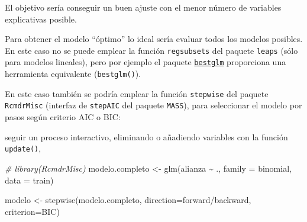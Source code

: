 \documentclass[
  spanish,
]{book}
\newenvironment{Shaded}{\begin{snugshade}}{\end{snugshade}}
\newcommand{\AttributeTok}[1]{\textcolor[rgb]{0.77,0.63,0.00}{#1}}
\newcommand{\CommentTok}[1]{\textcolor[rgb]{0.56,0.35,0.01}{\textit{#1}}}
\newcommand{\FunctionTok}[1]{\textcolor[rgb]{0.00,0.00,0.00}{#1}}
\newcommand{\NormalTok}[1]{#1}
\newcommand{\OtherTok}[1]{\textcolor[rgb]{0.56,0.35,0.01}{#1}}
\newcommand{\SpecialCharTok}[1]{\textcolor[rgb]{0.00,0.00,0.00}{#1}}
\newcommand{\StringTok}[1]{\textcolor[rgb]{0.31,0.60,0.02}{#1}}
\theoremstyle{break}
\theoremstyle{definition}
\theoremstyle{definition}
\theoremstyle{definition}
\theoremstyle{definition}
\theoremstyle{remark}
\begin{document}
El objetivo sería conseguir un buen ajuste con el menor número de variables explicativas posible.

Para obtener el modelo ``óptimo'' lo ideal sería evaluar todos los modelos posibles.
En este caso no se puede emplear la función \texttt{regsubsets} del paquete \texttt{leaps} (sólo para modelos lineales),
pero por ejemplo el paquete
\href{https://cran.r-project.org/web/packages/bestglm/vignettes/bestglm.pdf}{\texttt{bestglm}}
proporciona una herramienta equivalente (\texttt{bestglm()}).

En este caso también se podría emplear la función \texttt{stepwise} del paquete \texttt{RcmdrMisc} (interfaz de \texttt{stepAIC} del paquete \texttt{MASS}), para seleccionar el modelo por pasos según criterio AIC o BIC:

seguir un proceso interactivo, eliminando o añadiendo variables con la función \texttt{update()},

\begin{Shaded}
\begin{Highlighting}[]
\CommentTok{\# library(RcmdrMisc)}
\NormalTok{modelo.completo }\OtherTok{\textless{}{-}} \FunctionTok{glm}\NormalTok{(alianza }\SpecialCharTok{\textasciitilde{}}\NormalTok{ ., }\AttributeTok{family =}\NormalTok{ binomial, }\AttributeTok{data =}\NormalTok{ train)}

\NormalTok{modelo }\OtherTok{\textless{}{-}} \FunctionTok{stepwise}\NormalTok{(modelo.completo, }\AttributeTok{direction=}\StringTok{\textquotesingle{}forward/backward\textquotesingle{}}\NormalTok{, }\AttributeTok{criterion=}\StringTok{\textquotesingle{}BIC\textquotesingle{}}\NormalTok{)}
\end{Highlighting}
\end{Shaded}
\end{document}
